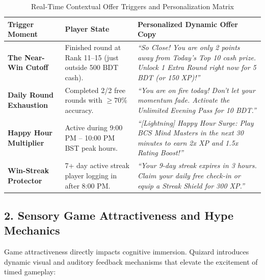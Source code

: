 \begin{table}[htbp]
\centering
\small
\begin{tabular}{|p{3.8cm}|p{3.8cm}|p{6.4cm}|}
\hline
\rowcolor{primaryBlue!15}
\textbf{Trigger Moment} & \textbf{Player State} & \textbf{Personalized Dynamic Offer Copy} \\ \hline
\textbf{The Near-Win Cutoff} & Finished round at Rank 11--15 (just outside 500 BDT cash). & \textit{``So Close! You are only 2 points away from Today's Top 10 cash prize. Unlock 1 Extra Round right now for 5 BDT (or 150 XP)!''} \\ \hline
\textbf{Daily Round Exhaustion} & Completed 2/2 free rounds with $\ge 70\%$ accuracy. & \textit{``You are on fire today! Don't let your momentum fade. Activate the Unlimited Evening Pass for 10 BDT.''} \\ \hline
\textbf{Happy Hour Multiplier} & Active during 9:00 PM -- 10:00 PM BST peak hours. & \textit{``[Lightning] Happy Hour Surge: Play BCS Mind Masters in the next 30 minutes to earn 2x XP and 1.5x Rating Boost!''} \\ \hline
\textbf{Win-Streak Protector} & 7+ day active streak player logging in after 8:00 PM. & \textit{``Your 9-day streak expires in 3 hours. Claim your daily free check-in or equip a Streak Shield for 300 XP.''} \\ \hline
\end{tabular}
\caption{Real-Time Contextual Offer Triggers and Personalization Matrix}
\end{table}

\subsection{2. Sensory Game Attractiveness and Hype Mechanics}
Game attractiveness directly impacts cognitive immersion. Quizard introduces dynamic visual and auditory feedback mechanisms that elevate the excitement of timed gameplay:


